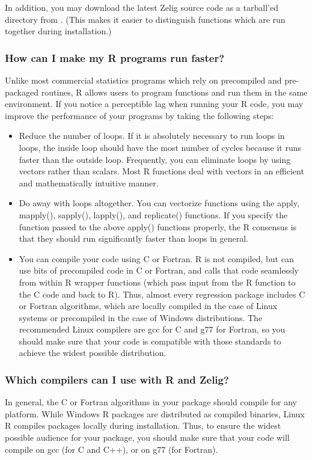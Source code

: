 \documentclass[letterpaper,10pt,english]{sphinxmanual}
\begin{document}
In addition, you may download the latest Zelig source code as a
tarball’ed directory from . (This makes it easier to distinguish
functions which are run together during installation.)


\subsubsection{How can I make my R programs run faster?}
\label{docs/faq:how-can-i-make-my-r-programs-run-faster}
Unlike most commercial statistics programs which rely on precompiled and
pre-packaged routines, R allows users to program functions and run them
in the same environment. If you notice a perceptible lag when running
your R code, you may improve the performance of your programs by taking
the following steps:
\begin{itemize}
\item {} 
Reduce the number of loops. If it is absolutely necessary to run
loops in loops, the inside loop should have the most number of cycles
because it runs faster than the outside loop. Frequently, you can
eliminate loops by using vectors rather than scalars. Most R
functions deal with vectors in an efficient and mathematically
intuitive manner.

\item {} 
Do away with loops altogether. You can vectorize functions using the
apply, mapply(), sapply(), lapply(), and replicate() functions. If
you specify the function passed to the above apply() functions
properly, the R consensus is that they should run significantly
faster than loops in general.

\item {} 
You can compile your code using C or Fortran. R is not compiled, but
can use bits of precompiled code in C or Fortran, and calls that code
seamlessly from within R wrapper functions (which pass input from the
R function to the C code and back to R). Thus, almost every
regression package includes C or Fortran algorithms, which are
locally compiled in the case of Linux systems or precompiled in the
case of Windows distributions. The recommended Linux compilers are
gcc for C and g77 for Fortran, so you should make sure that your code
is compatible with those standards to achieve the widest possible
distribution.

\end{itemize}


\subsubsection{Which compilers can I use with R and Zelig?}
\label{docs/faq:which-compilers-can-i-use-with-r-and-zelig}
In general, the C or Fortran algorithms in your package should compile
for any platform. While Windows R packages are distributed as compiled
binaries, Linux R compiles packages locally during installation. Thus,
to ensure the widest possible audience for your package, you should make
sure that your code will compile on gcc (for C and C++), or on g77 (for
Fortran).
\end{document}
